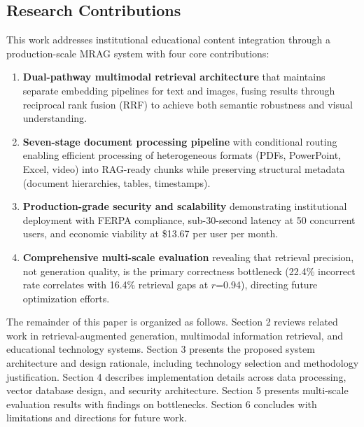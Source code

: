 \documentclass[11pt,a4paper,twocolumn]{article}
\begin{document}
\subsection{Research Contributions}

This work addresses institutional educational content integration through a production-scale MRAG system with four core contributions:

\begin{enumerate}
    \item \textbf{Dual-pathway multimodal retrieval architecture} that maintains separate embedding pipelines for text and images, fusing results through reciprocal rank fusion (RRF) to achieve both semantic robustness and visual understanding.

    \item \textbf{Seven-stage document processing pipeline} with conditional routing enabling efficient processing of heterogeneous formats (PDFs, PowerPoint, Excel, video) into RAG-ready chunks while preserving structural metadata (document hierarchies, tables, timestamps).

    \item \textbf{Production-grade security and scalability} demonstrating institutional deployment with FERPA compliance, sub-30-second latency at 50 concurrent users, and economic viability at \$13.67 per user per month.

    \item \textbf{Comprehensive multi-scale evaluation} revealing that retrieval precision, not generation quality, is the primary correctness bottleneck (22.4\% incorrect rate correlates with 16.4\% retrieval gaps at $r$=0.94), directing future optimization efforts.
\end{enumerate}

The remainder of this paper is organized as follows. Section 2 reviews related work in retrieval-augmented generation, multimodal information retrieval, and educational technology systems. Section 3 presents the proposed system architecture and design rationale, including technology selection and methodology justification. Section 4 describes implementation details across data processing, vector database design, and security architecture. Section 5 presents multi-scale evaluation results with findings on bottlenecks. Section 6 concludes with limitations and directions for future work.

\end{document}

